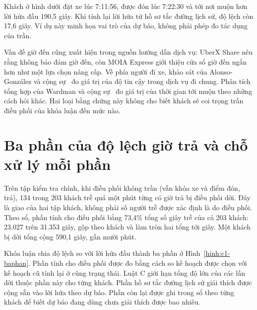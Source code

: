 Khách ở hình dưới đặt xe lúc 7:11:56, được đón lúc 7:22:30 và tới nơi muộn hơn lời hứa đầu 190,5 giây.
Khi tính lại lời hứa từ hồ sơ tắc đường lịch sử, độ lệch còn 17,6 giây. Ví dụ này minh họa vai trò của dự báo,
không phải phép đo tác dụng của trần.

Vấn đề giờ đến cũng xuất hiện trong nguồn hướng dẫn dịch vụ: UberX Share nêu rằng không bảo đảm giờ đến,
còn MOIA Express giới thiệu cửa sổ giờ đến ngắn hơn như một lựa chọn nâng cấp. Về phía người đi xe, khảo sát của
Alonso-González và cộng sự~\cite{alonsogonzalez2020} đo giá trị của độ tin cậy trong dịch vụ đi chung.
Phân tích tổng hợp của Wardman và cộng sự~\cite{wardman2026} đo giá trị của thời gian tới muộn theo những cách hỏi khác.
Hai loại bằng chứng này không cho biết khách sẽ coi trọng trần điều phối của khóa luận đến mức nào.

\section{Ba phần của độ lệch giờ trả và chỗ xử lý mỗi phần}
\label{muc:c1-cauhoi}

Trên tập kiểm tra chính, khi điều phối không trần (vẫn khóa xe và điểm đón, trả), 134 trong 203 khách trễ quá một phút từng có giờ trả bị
điều phối dời. Đây là giao của hai tập khách, không phải số người trễ được xác định là do điều phối.
Theo sổ, phần tính cho điều phối bằng 73,4\% tổng số giây trễ của cả 203 khách: 23.027 trên 31.353 giây,
gộp theo khách và làm tròn hai tổng tới giây. Một khách bị dời tổng cộng 590,1 giây, gần mười phút.

Khóa luận chia độ lệch so với lời hứa đầu thành ba phần ở Hình~\ref{hinh:c1-baphan}. Phần tính cho điều phối
được đo bằng cách so kế hoạch được chọn với kế hoạch cũ tính lại ở cùng trạng thái. Luật C giới hạn tổng độ lớn
của các lần dời thuộc phần này cho từng khách. Phần hồ sơ tắc đường lịch sử giải thích được cộng sẵn vào lời hứa
theo dự báo. Phần còn lại được ghi trong sổ theo từng khách để biết dự báo đang dùng chưa giải thích được bao nhiêu.

